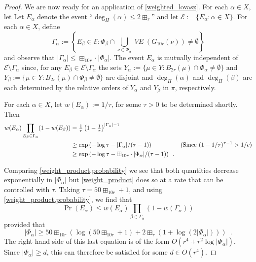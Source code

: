 \documentclass{patmorin}
\newcommand{\vol}[1]{\boxplus_{#1}}
\DeclareMathOperator{\VE}{\mathit{VE}}
\begin{document}
\begin{proof}
  We are now ready for an application of \cref{weighted_lovasz}.  For each $\alpha\in X$, let Let $E_\alpha$ denote the event ``$\deg_H(\alpha)\le 2\vol{r}$'' and let $\mathcal{E}:=\{E_\alpha:\alpha\in X\}$. For each $\alpha\in X$, define
  \[
     \Gamma_\alpha := \left\{E_\beta \in \mathcal{E}: \Phi_\beta\cap \bigcup_{\nu\in \Phi_\alpha} \VE(G_{10r}(\nu))\neq\emptyset\right\}
  \]
  and observe that $|\Gamma_\alpha|\le \vol{10r}\cdot|\Phi_\alpha|$.
  The event $E_\alpha$ is mutually independent of $\mathcal{E}\setminus\Gamma_\alpha$ since, for any $E_\beta\in\mathcal{E}\setminus\Gamma_\alpha$ the sets $Y_\alpha:=\{\mu\in Y:B_{2r}(\mu)\cap \Phi_\alpha\neq\emptyset\}$ and $Y_\beta:=\{\mu\in Y:B_{2r}(\mu)\cap \Phi_\beta\neq\emptyset\}$ are disjoint and $\deg_H(\alpha)$ and $\deg_H(\beta)$ are each determined by the relative orders of $Y_\alpha$ and $Y_\beta$ in $\pi$, respectively.

  For each $\alpha\in X$, let $w(E_\alpha):=1/\tau$, for some $\tau>0$ to be determined shortly.  Then
  \begin{align}
    w(E_\alpha)\prod_{E_\beta\in\Gamma_\alpha} (1-w(E_\beta))
    & = \tfrac{1}{\tau}\left(1-\tfrac{1}{\tau}\right)^{|\Gamma_\alpha|-1} \notag \\
    & \ge \exp\left(-\log\tau - |\Gamma_\alpha|/(\tau-1)\right) & \text{(Since $(1-1/\tau)^{\tau-1} > 1/e$)} \notag \\
    & \ge \exp\left(-\log\tau - \vol{10r}\cdot|\Phi_\alpha|/(\tau-1)\right) \enspace . \label{weight_product}
  \end{align}

  Comparing \cref{weight_product,probability} we see that both quantities decrease exponentially in $|\Phi_\alpha|$ but \cref{weight_product} does so at a rate that can be controlled with $\tau$.
  Taking $\tau = {50\vol{10r}}+1$, and using \cref{weight_product,probability}, we find that
  \[
     \Pr\left(E_\alpha\right) \le w(E_\alpha)\prod_{\beta\in\Gamma_\alpha}(1-w(\Gamma_\alpha))
  \]
  provided that
  \[   |\Phi_\alpha| \ge {50\vol{10r}}\left(\log({50\vol{10r}}+1) + {2\vol{r}}(1+\log(2|\Phi_\alpha|))\right) \enspace .
  \]
  The right hand side of this last equation is of the form $O(r^4+r^2\log|\Phi_\alpha|)$.  Since $|\Phi_\alpha|\ge d$, this can therefore be satisfied for some $d\in O(r^4)$.



\end{proof}
\end{document}
